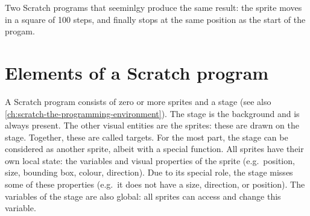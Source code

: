 \documentclass[../main]{subfiles}
\begin{document}
\begin{listing}
    \centering
    \begin{subfigure}{0.45\textwidth}
        \centering
        \begin{scratch}[scale=0.7]
        \end{scratch}
    \end{subfigure}
    \begin{subfigure}{0.45\textwidth}
        \centering
        \begin{scratch}[scale=0.7]
        \end{scratch}
    \end{subfigure}
    \caption{Two Scratch programs that seeminlgy produce the same result: the sprite moves in a square of 100 steps, and finally stops at the same position as the start of the progam.}
    \label{lst:scratch-two-programs}
\end{listing}

\section{Elements of a Scratch program}\label{sec:elements-of-a-scratch-program}

A Scratch program consists of zero or more sprites and a stage (see also \cref{ch:scratch-the-programming-environment}).
The stage is the background and is always present.
The other visual entities are the sprites: these are drawn on the stage.
Together, these are called targets.
For the most part, the stage can be considered as another sprite, albeit with a special function.
All sprites have their own local state: the variables and visual properties of the sprite (e.g.\ position, size, bounding box, colour, direction).
Due to its special role, the stage misses some of these properties (e.g.\ it does not have a size, direction, or position).
The variables of the stage are also global: all sprites can access and change this variable.
\end{document}

